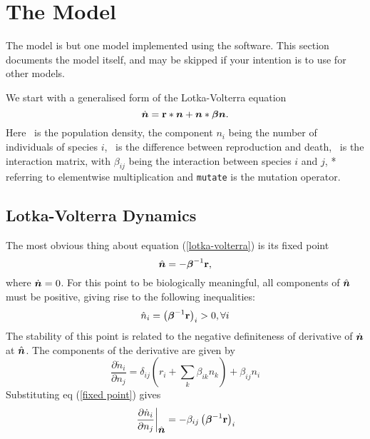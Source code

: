 \section{The \protect\EcoLab{} Model}\label{model}

The \EcoLab{} model is but one model implemented using the \EcoLab{}
software. This section documents the model itself, and may be skipped
if your intention is to use \EcoLab{} for other models.

We start with a generalised form of the Lotka-Volterra equation 
\begin{equation}\label{lotka-volterra}
\dot{\mbox{\boldmath{$n$}}} = \mbox{${\bf r}$}*\mbox{\boldmath{$n$}} + \mbox{\boldmath{$n$}}*\mbox{\boldmath{$\beta$}}\mbox{\boldmath{$n$}}.
\end{equation}
Here \bn\ is the population density, the component $n_i$ being the
number of individuals of species $i$, \br\ is the difference
between reproduction and death, \bbeta\ is the interaction matrix,
with $\beta_{ij}$ being the interaction between species $i$ and $j$, *
referring to elementwise multiplication and {\tt mutate} is the
mutation operator.

\subsection{Lotka-Volterra Dynamics}

The most obvious thing about equation (\ref{lotka-volterra}) is its
fixed point 
\begin{equation}\label{fixed point}
\hat{\mbox{\boldmath{$n$}}} = -\mbox{\boldmath{$\beta$}}^{-1}\mbox{${\bf r}$},
\end{equation}
where $\dot{\mbox{\boldmath{$n$}}}=0$. For this point to be biologically meaningful, all
components of $\hat{\mbox{\boldmath{$n$}}}$ must be positive, giving rise to the following
inequalities:
\begin{equation}\label{positive species}
\hat n_i = \left(\mbox{\boldmath{$\beta$}}^{-1}\mbox{${\bf r}$}\right)_i>0, \forall i
\end{equation}
The stability of this point is related to the
negative definiteness of derivative of $\dot{\mbox{\boldmath{$n$}}}$ at $\hat{\mbox{\boldmath{$n$}}}$. The
components of the derivative are given by
\begin{equation}\label{derivative}
\frac{\partial\dot{n}_i}{\partial n_j} =
\delta_{ij}\left(r_i+\sum_k\beta_{ik}n_k\right) + \beta_{ij}n_i
\end{equation}
Substituting eq (\ref{fixed point}) gives
\begin{equation}
\left.\frac{\partial\dot{n}_i}{\partial n_j}\right|_{\hat{\mbox{\boldmath{$n$}}}}=
-\beta_{ij}\left(\mbox{\boldmath{$\beta$}}^{-1}\mbox{${\bf r}$}\right)_i
\end{equation}


